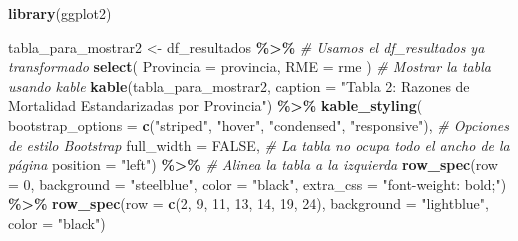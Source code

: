 \documentclass[
]{article}
\newenvironment{Shaded}{\begin{snugshade}}{\end{snugshade}}
\newcommand{\AttributeTok}[1]{\textcolor[rgb]{0.13,0.29,0.53}{#1}}
\newcommand{\CommentTok}[1]{\textcolor[rgb]{0.56,0.35,0.01}{\textit{#1}}}
\newcommand{\ConstantTok}[1]{\textcolor[rgb]{0.56,0.35,0.01}{#1}}
\newcommand{\DecValTok}[1]{\textcolor[rgb]{0.00,0.00,0.81}{#1}}
\newcommand{\FunctionTok}[1]{\textcolor[rgb]{0.13,0.29,0.53}{\textbf{#1}}}
\newcommand{\NormalTok}[1]{#1}
\newcommand{\OtherTok}[1]{\textcolor[rgb]{0.56,0.35,0.01}{#1}}
\newcommand{\SpecialCharTok}[1]{\textcolor[rgb]{0.81,0.36,0.00}{\textbf{#1}}}
\newcommand{\StringTok}[1]{\textcolor[rgb]{0.31,0.60,0.02}{#1}}
\begin{document}
\begin{Shaded}
\begin{Highlighting}[]
\FunctionTok{library}\NormalTok{(ggplot2)}

\NormalTok{tabla\_para\_mostrar2 }\OtherTok{\textless{}{-}}\NormalTok{ df\_resultados }\SpecialCharTok{\%\textgreater{}\%} \CommentTok{\# Usamos el df\_resultados ya transformado}
  \FunctionTok{select}\NormalTok{(}
    \AttributeTok{Provincia =}\NormalTok{ provincia,}
    \AttributeTok{RME =}\NormalTok{ rme}
\NormalTok{  ) }
\CommentTok{\# Mostrar la tabla usando kable}
\FunctionTok{kable}\NormalTok{(tabla\_para\_mostrar2, }\AttributeTok{caption =} \StringTok{"Tabla 2: Razones de Mortalidad Estandarizadas por Provincia"}\NormalTok{) }\SpecialCharTok{\%\textgreater{}\%}
  \FunctionTok{kable\_styling}\NormalTok{(}
    \AttributeTok{bootstrap\_options =} \FunctionTok{c}\NormalTok{(}\StringTok{"striped"}\NormalTok{, }\StringTok{"hover"}\NormalTok{, }\StringTok{"condensed"}\NormalTok{, }\StringTok{"responsive"}\NormalTok{), }\CommentTok{\# Opciones de estilo Bootstrap}
    \AttributeTok{full\_width =} \ConstantTok{FALSE}\NormalTok{, }\CommentTok{\# La tabla no ocupa todo el ancho de la página}
    \AttributeTok{position =} \StringTok{"left"}\NormalTok{) }\SpecialCharTok{\%\textgreater{}\%}  \CommentTok{\# Alinea la tabla a la izquierda}
    \FunctionTok{row\_spec}\NormalTok{(}\AttributeTok{row =} \DecValTok{0}\NormalTok{, }\AttributeTok{background =} \StringTok{"steelblue"}\NormalTok{, }\AttributeTok{color =} \StringTok{"black"}\NormalTok{, }\AttributeTok{extra\_css =} \StringTok{"font{-}weight: bold;"}\NormalTok{) }\SpecialCharTok{\%\textgreater{}\%} 
  \FunctionTok{row\_spec}\NormalTok{(}\AttributeTok{row =} \FunctionTok{c}\NormalTok{(}\DecValTok{2}\NormalTok{, }\DecValTok{9}\NormalTok{, }\DecValTok{11}\NormalTok{, }\DecValTok{13}\NormalTok{, }\DecValTok{14}\NormalTok{, }\DecValTok{19}\NormalTok{, }\DecValTok{24}\NormalTok{), }\AttributeTok{background =} \StringTok{"lightblue"}\NormalTok{, }\AttributeTok{color =} \StringTok{"black"}\NormalTok{)}
\end{Highlighting}
\end{Shaded}
\end{document}
